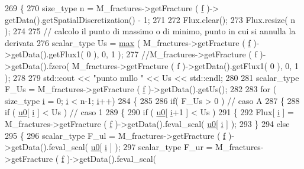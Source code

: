 \begin{DoxyCode}
269 \{
270     size\_type n = M\_fractures->getFracture ( \hyperlink{god__e_8m_a68f477f9b30a6300d5af9b02eac82f35}{f} )-> getData().getSpatialDiscretization() - 1;
271 
272     Flux.clear();
273     Flux.resize( n );
274 
275     \textcolor{comment}{// calcolo il punto di massimo o di minimo, punto in cui si annulla la derivata}
276     scalar\_type Us = \hyperlink{UsefulFunctions_8h_a41a4284c74a9bcf6e35509f5eec72a55}{max} ( M\_fractures->getFracture ( \hyperlink{god__e_8m_a68f477f9b30a6300d5af9b02eac82f35}{f} )->getData().getFlux1( 0 ), 0, 1 );
277     \textcolor{comment}{//M\_fractures->getFracture ( f )->getData().fzero( M\_fractures->getFracture ( f )->getData().getFlux1(
       0 ), 0, 1 );}
278 
279     std::cout << \textcolor{stringliteral}{"punto nullo "} << Us << std::endl;
280 
281     scalar\_type F\_Us = M\_fractures->getFracture ( \hyperlink{god__e_8m_a68f477f9b30a6300d5af9b02eac82f35}{f} )->getData().getUs();
282 
283     \textcolor{keywordflow}{for} ( size\_type \hyperlink{god__e_8m_a8604be5925f4266ab5ccc69675329c80}{i} = 0; \hyperlink{god__e_8m_a8604be5925f4266ab5ccc69675329c80}{i} < n-1; \hyperlink{god__e_8m_a8604be5925f4266ab5ccc69675329c80}{i}++)
284     \{
285 
286         \textcolor{keywordflow}{if}( F\_Us > 0 )      \textcolor{comment}{// caso A}
287         \{
288             \textcolor{keywordflow}{if} ( \hyperlink{god__e_8m_ae060ce5868d35ef17bcb6e832da03be9}{u0}[ \hyperlink{god__e_8m_a8604be5925f4266ab5ccc69675329c80}{i} ] < Us )      \textcolor{comment}{// caso 1}
289             \{
290                 \textcolor{keywordflow}{if} ( \hyperlink{god__e_8m_ae060ce5868d35ef17bcb6e832da03be9}{u0}[ \hyperlink{god__e_8m_a8604be5925f4266ab5ccc69675329c80}{i}+1 ] < Us )
291                 \{
292                     Flux[ \hyperlink{god__e_8m_a8604be5925f4266ab5ccc69675329c80}{i} ] = M\_fractures->getFracture ( \hyperlink{god__e_8m_a68f477f9b30a6300d5af9b02eac82f35}{f} )->getData().feval\_scal( 
      \hyperlink{god__e_8m_ae060ce5868d35ef17bcb6e832da03be9}{u0}[ \hyperlink{god__e_8m_a8604be5925f4266ab5ccc69675329c80}{i} ] );
293                 \}
294                 \textcolor{keywordflow}{else}
295                 \{
296                     scalar\_type F\_ul = M\_fractures->getFracture ( \hyperlink{god__e_8m_a68f477f9b30a6300d5af9b02eac82f35}{f} )->getData().feval\_scal( 
      \hyperlink{god__e_8m_ae060ce5868d35ef17bcb6e832da03be9}{u0}[ \hyperlink{god__e_8m_a8604be5925f4266ab5ccc69675329c80}{i} ] );
297                     scalar\_type F\_ur = M\_fractures->getFracture ( \hyperlink{god__e_8m_a68f477f9b30a6300d5af9b02eac82f35}{f} )->getData().feval\_scal( 

\end{DoxyCode}
